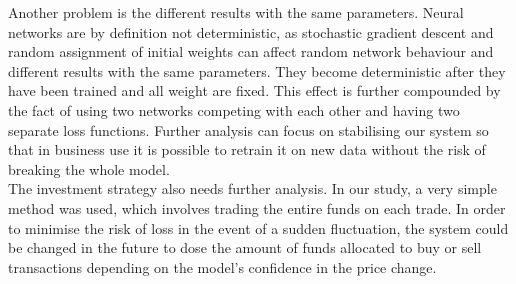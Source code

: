 \documentclass[11pt]{article} %
\begin{document}
Another problem is the different results with the same parameters. Neural networks are by definition not deterministic, as stochastic gradient descent and random assignment of initial weights can affect random network behaviour and different results with the same parameters. They become deterministic after they have been trained and all weight are fixed. This effect is further compounded by the fact of using two networks competing with each other and having two separate loss functions. Further analysis can focus on stabilising our system so that in business use it is possible to retrain it on new data without the risk of breaking the whole model. \\

The investment strategy also needs further analysis. In our study, a very simple method was used, which involves trading the entire funds on each trade. In order to minimise the risk of loss in the event of a sudden fluctuation, the system could be changed in the future to dose the amount of funds allocated to buy or sell transactions depending on the model's confidence in the price change. 
\end{document}
